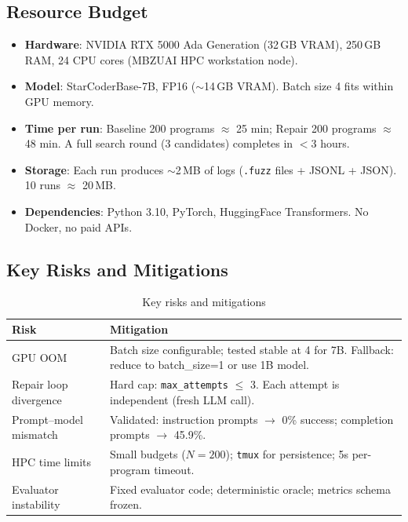 \documentclass[conference]{IEEEtran}
\begin{document}
\subsection{Resource Budget}

\begin{itemize}
    \item \textbf{Hardware}: NVIDIA RTX 5000 Ada Generation (32\,GB VRAM), 250\,GB RAM, 24 CPU cores (MBZUAI HPC workstation node).
    \item \textbf{Model}: StarCoderBase-7B, FP16 ($\sim$14\,GB VRAM). Batch size 4 fits within GPU memory.
    \item \textbf{Time per run}: Baseline 200 programs $\approx$ 25 min; Repair 200 programs $\approx$ 48 min. A full search round (3 candidates) completes in $<$3 hours.
    \item \textbf{Storage}: Each run produces $\sim$2\,MB of logs (\texttt{.fuzz} files + JSONL + JSON). 10 runs $\approx$ 20\,MB.
    \item \textbf{Dependencies}: Python 3.10, PyTorch, HuggingFace Transformers. No Docker, no paid APIs.
\end{itemize}

\subsection{Key Risks and Mitigations}

\begin{table}[t]
\centering
\caption{Key risks and mitigations}
\label{tab:risks}
\begin{tabular}{p{}p{}}
\toprule
\textbf{Risk} & \textbf{Mitigation} \\
\midrule
GPU OOM & Batch size configurable; tested stable at 4 for 7B. Fallback: reduce to batch\_size=1 or use 1B model. \\
\addlinespace
Repair loop divergence & Hard cap: \texttt{max\_attempts} $\leq$ 3. Each attempt is independent (fresh LLM call). \\
\addlinespace
Prompt--model mismatch & Validated: instruction prompts $\to$ 0\% success; completion prompts $\to$ 45.9\%. \\
\addlinespace
HPC time limits & Small budgets ($N = 200$); \texttt{tmux} for persistence; 5s per-program timeout. \\
\addlinespace
Evaluator instability & Fixed evaluator code; deterministic oracle; metrics schema frozen. \\
\bottomrule
\end{tabular}
\end{table}
\end{document}
